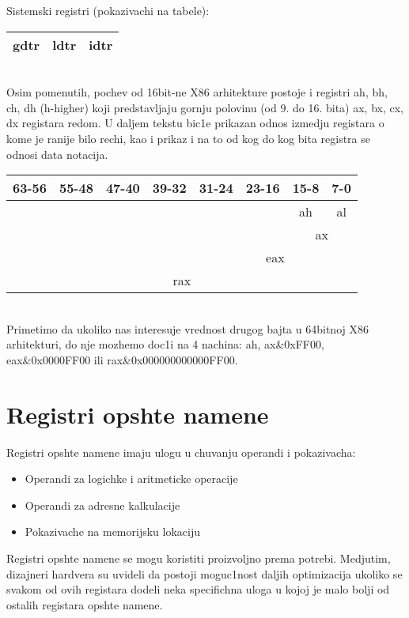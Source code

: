 \documentclass[a4paper,fleqn,12pt]{JMThesis}
\newcommand\eng{\fontencoding{OT1}\fontfamily{\rmdefault}\selectfont}
\begin{document}
Sistemski registri (pokazivachi na tabele):\\[1mm]
{\eng\begin{tabular}{|c|c|c|}
\hline
gdtr & ldtr & idtr \\
\hline
\end{tabular}}\\

Osim pomenutih, pochev od 16bit-ne {\eng X86} arhitekture postoje i registri
{\eng ah, bh, ch, dh (h-higher)} koji predstavljaju gornju polovinu (od 9. do
16. bita) {\eng ax, bx, cx, dx} registara redom. U daljem tekstu bic1e prikazan
odnos izmedju registara o kome je ranije bilo rechi, kao i prikaz i na to od
kog do kog bita registra se odnosi data notacija.\\

{\eng\begin{tabular}{|c|c|c|c|c|c|c|c|}
63-56 & 55-48 & 47-40 & 39-32 & 31-24 & 23-16 & 15-8 & 7-0 \\
\hline
&&&&&& ah & al \\
\hline
&&&&&& \multicolumn{2}{|c|}{ax} \\
\hline
&&&& \multicolumn{4}{|c|}{eax} \\
\hline
\multicolumn{8}{|c|}{rax} \\
\hline
\end{tabular}}\\

Primetimo da ukoliko nas interesuje vrednost drugog bajta u 64bitnoj {\eng X86}
arhitekturi, do nje mozhemo doc1i na 4 nachina:
{\eng ah, ax\&0xFF00, eax\&0x0000FF00} ili {\eng rax\&0x000000000000FF00}.


\section{Registri opshte namene}
\medskip

Registri opshte namene imaju ulogu u chuvanju operandi i pokazivacha:
\begin{itemize}
\item Operandi za logichke i aritmeticke operacije
\item Operandi za adresne kalkulacije
\item Pokazivache na memorijsku lokaciju
\end{itemize}

Registri opshte namene se mogu koristiti proizvoljno prema potrebi. Medjutim,
dizajneri hardvera su uvideli da postoji moguc1nost daljih optimizacija ukoliko
se svakom od ovih registara dodeli neka specifichna uloga u kojoj je malo bolji
od ostalih registara opshte namene.\\
\end{document}
